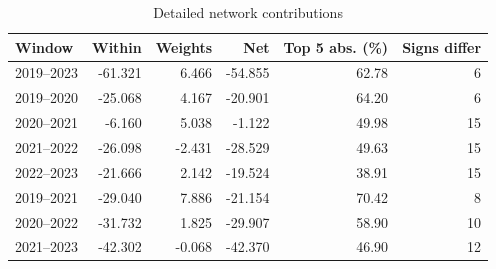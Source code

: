 \begin{table}[htbp]\centering\small
\caption{Detailed network contributions}\label{tab:si_contributions}
\begin{tabular}{@{}lrrrrr@{}}
\toprule
Window & Within & Weights & Net & Top 5 abs. (\%) & Signs differ\\\midrule
2019--2023 & -61.321 & 6.466 & -54.855 & 62.78 & 6\\
2019--2020 & -25.068 & 4.167 & -20.901 & 64.20 & 6\\
2020--2021 & -6.160 & 5.038 & -1.122 & 49.98 & 15\\
2021--2022 & -26.098 & -2.431 & -28.529 & 49.63 & 15\\
2022--2023 & -21.666 & 2.142 & -19.524 & 38.91 & 15\\
2019--2021 & -29.040 & 7.886 & -21.154 & 70.42 & 8\\
2020--2022 & -31.732 & 1.825 & -29.907 & 58.90 & 10\\
2021--2023 & -42.302 & -0.068 & -42.370 & 46.90 & 12\\
\bottomrule\end{tabular}
\end{table}
